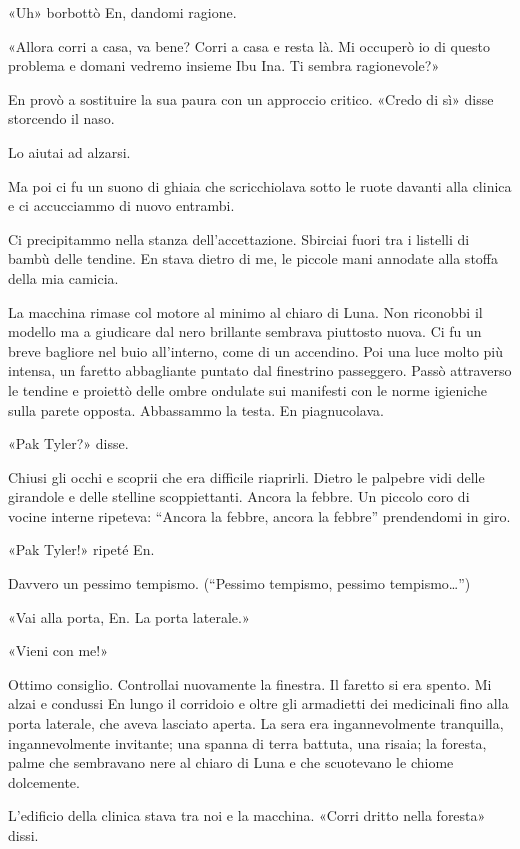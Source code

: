«Uh» borbottò En, dandomi ragione.

«Allora corri a casa, va bene? Corri a casa e resta là. Mi occuperò io
di questo problema e domani vedremo insieme Ibu Ina. Ti sembra
ragionevole?»

En provò a sostituire la sua paura con un approccio critico. «Credo di
sì» disse storcendo il naso.

Lo aiutai ad alzarsi.

Ma poi ci fu un suono di ghiaia che scricchiolava sotto le ruote davanti
alla clinica e ci accucciammo di nuovo entrambi.

\separatorefiori

Ci precipitammo nella stanza dell'accettazione. Sbirciai fuori tra i
listelli di bambù delle tendine. En stava dietro di me, le piccole mani
annodate alla stoffa della mia camicia.

La macchina rimase col motore al minimo al chiaro di Luna. Non riconobbi
il modello ma a giudicare dal nero brillante sembrava piuttosto nuova.
Ci fu un breve bagliore nel buio all'interno, come di un accendino. Poi
una luce molto più intensa, un faretto abbagliante puntato dal
finestrino passeggero. Passò attraverso le tendine e proiettò delle
ombre ondulate sui manifesti con le norme igieniche sulla parete
opposta. Abbassammo la testa. En piagnucolava.

«Pak Tyler?» disse.

Chiusi gli occhi e scoprii che era difficile riaprirli. Dietro le
palpebre vidi delle girandole e delle stelline scoppiettanti. Ancora la
febbre. Un piccolo coro di vocine interne ripeteva: ``Ancora la febbre,
ancora la febbre'' prendendomi in giro.

«Pak Tyler!» ripeté En.

Davvero un pessimo tempismo. (``Pessimo tempismo, pessimo
tempismo\ldots'')

«Vai alla porta, En. La porta laterale.»

«Vieni con me!»

Ottimo consiglio. Controllai nuovamente la finestra. Il faretto si era
spento. Mi alzai e condussi En lungo il corridoio e oltre gli armadietti
dei medicinali fino alla porta laterale, che aveva lasciato aperta. La
sera era ingannevolmente tranquilla, ingannevolmente invitante; una
spanna di terra battuta, una risaia; la foresta, palme che sembravano
nere al chiaro di Luna e che scuotevano le chiome dolcemente.

L'edificio della clinica stava tra noi e la macchina. «Corri dritto
nella foresta» dissi.

